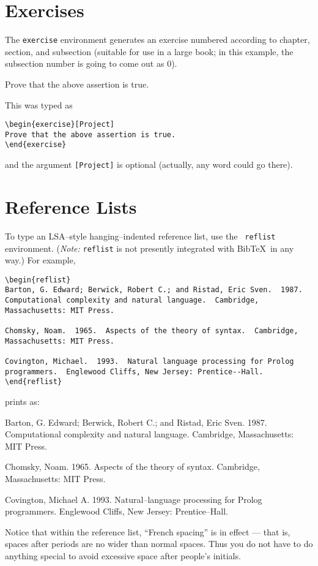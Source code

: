 \documentclass{article}
\begin{document}
\section{Exercises}

The {\tt exercise} environment generates an exercise numbered according 
to chapter, section, and subsection (suitable for use in a large book; 
in this example, the subsection number is going to come out as 0).
\begin{exercise}[Project]
Prove that the above assertion is true.
\end{exercise}
This was typed as
\begin{verbatim}
\begin{exercise}[Project]
Prove that the above assertion is true.
\end{exercise}
\end{verbatim}
and the argument \verb"[Project]" is optional (actually, any word could 
go there).

\section{Reference Lists}

To type an LSA--style hanging--indented reference list, use the {\tt 
reflist} environment.  ({\em Note:\/} {\tt reflist} is not presently
integrated with Bib\TeX\ in any way.)  For example,
\begin{verbatim}
\begin{reflist}
Barton, G. Edward; Berwick, Robert C.; and Ristad, Eric Sven.  1987.
Computational complexity and natural language.  Cambridge, 
Massachusetts: MIT Press.

Chomsky, Noam.  1965.  Aspects of the theory of syntax.  Cambridge,
Massachusetts: MIT Press.

Covington, Michael.  1993.  Natural language processing for Prolog
programmers.  Englewood Cliffs, New Jersey: Prentice--Hall.
\end{reflist}
\end{verbatim}
prints as:
\begin{reflist}
Barton, G. Edward; Berwick, Robert C.; and Ristad, Eric Sven.  1987.
Computational complexity and natural language.  Cambridge, 
Massachusetts: MIT Press.

Chomsky, Noam.  1965.  Aspects of the theory of syntax.  Cambridge,
Massachusetts: MIT Press.

Covington, Michael A.  1993.  Natural--language processing for Prolog 
programmers.  Englewood Cliffs, New Jersey: Prentice--Hall.
\end{reflist}
Notice that within the reference list, ``French spacing'' is in effect 
--- that is, spaces after periods are no wider than normal spaces. Thus 
you do not have to do anything special to avoid excessive space after 
people's initials.
\end{document}

